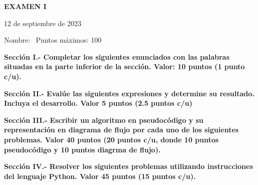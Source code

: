 \documentclass[10pt,addpoints]{exam}
\begin{document}
\begin{center}
  \sffamily\textbf{EXAMEN I}
\end{center}
\begin{flushright}
12 de septiembre de 2023
\end{flushright}
Nombre:~\makebox[4in]{\hrulefill}
Puntos máximos: 100

\begin{questions}
\begin{EnvFullwidth}
  \sffamily\textbf{Sección I.- Completar los siguientes enunciados con las
  palabras situadas en la parte inferior de la sección. Valor: 10 puntos
  (1 punto c/u).}
\end{EnvFullwidth}













\end{questions}

\begin{questions}
\begin{EnvFullwidth}
  \sffamily\textbf{Sección II.- Evalúe las siguientes expresiones y
  determine su resultado. Incluya el desarrollo. Valor 5 puntos (2.5 puntos
  c/u)}
\end{EnvFullwidth}





\end{questions}

\begin{questions}
\begin{EnvFullwidth}
  \sffamily\textbf{Sección III.- Escribir un algoritmo en pseudocódigo y su
  representación en diagrama de flujo por cada uno de los siguientes
  problemas. Valor 40 puntos (20 puntos c/u, donde 10 puntos pseudocódigo y
  10 puntos diagrma de flujo).}
\end{EnvFullwidth}

%
%
%

\end{questions}

\begin{questions}
\begin{EnvFullwidth}
  \sffamily\textbf{Sección IV.- Resolver los siguientes problemas utilizando
  instrucciones del lenguaje Python. Valor 45 puntos (15 puntos c/u).}
\end{EnvFullwidth}





\end{questions}
\end{document}
